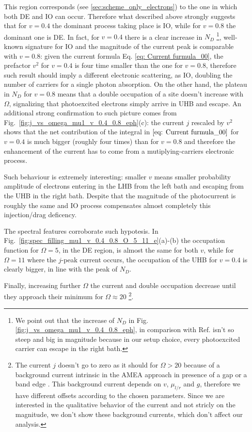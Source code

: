 \documentclass[aps,prb,groupedaddress,showpacs,twocolumn,superscriptaddress,10pt]{revtex4-2}
\begin{document}
This region corresponds (see \ref{sec:scheme_only_electrons}) to the one in which both DE and IO can occur. Therefore what described above strongly suggests that for $v=0.4$ the dominant process taking place is IO, while for $v=0.8$ the dominant one is DE. In fact, for $v=0.4$ there is a clear increase in $N_D$ \footnote{
We point out that the increase of $N_D$ in Fig.\ref{fig:j_vs_omega_mu1_v_0.4_0.8_eph}, in comparison with Ref.\cite{so.do.18} isn't so steep and big in magnitude because in our setup choice, every photoexcited carrier can escape in the right bath.}, well-known signature for IO \cite{so.do.18,ma.ev.22} and the magnitude of the current peak is comparable with $v=0.8$: given the current formula Eq. \eqref{eq: Current furmula_00}, the prefactor $v^2$ for $v=0.4$ is four time smaller than the one for $v=0.8$, therefore such result should imply a different electronic scattering, as IO, doubling the number of carriers for a single photon absorption. On the other hand, the plateau in $N_D$ for $v=0.8$ means that a double occupation of a site doesn't increase with $\Omega$, signalizing that photoexcited electrons simply arrive in UHB and escape. An additional strong confirmation to such picture comes from Fig.~\ref{fig:j_vs_omega_mu1_v_0.4_0.8_eph}(c): the current $j$ rescaled by $v^2$ shows that the net contribution of the integral in $\eqref{eq: Current furmula_00}$ for $v=0.4$ is much bigger (roughly four times) than for $v=0.8$ and therefore the enhancement of the current has to come from a mutiplying-carriers electronic process.   

Such behaviour is extremely interesting: smaller $v$ means smaller probability amplitude of electrons entering in the LHB from the left bath and escaping from the UHB in the right bath. Despite that the magnitude of the photocurrent is roughly the same and IO process compensates almost completely this injection/drag deficency.  
 
The spectral features corroborate such hypotesis. In Fig.~\ref{fig:spec_filling_mu1_v_0.4_0.8_O_5_11_e}(a)-(b) the occupation function for $\Omega=5$, in the DE region, is almost the same for both $v$, while for $\Omega=11$ where the $j$-peak current occurs, the occupation of the UHB for $v=0.4$ is clearly bigger, in line with the peak of $N_D$.

Finally, increasing further $\Omega$ the current and double occupation decrease until they approach their minimum for $\Omega\approx20$ \footnote{The current $j$ doesn't go to zero as it should for $\Omega>20$ because of a background current intrinsic in the AMEA approach in presence of a gap or a band edge \cite{so.do.18}. This background current depends on $v$, $\mu_{l/r}$ and $g$, therefore we have different offsets according to the chosen parameters. Since we are interested in the qualitative behavior of the current and not stricly on the magnitude, we don't show these background currents, which don't affect our analysis.}.  
  
\end{document}
